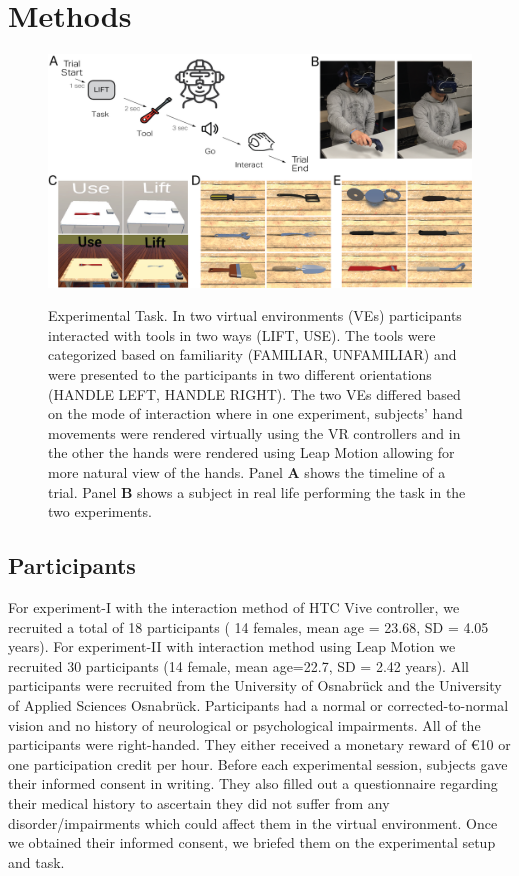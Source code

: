 \section{Methods}

\begin{figure}[H]
    \centering
    \includegraphics[width=1\linewidth]{source/figures/setup/Methods_1.png} \\
    \caption[]{Experimental Task. In two virtual environments (VEs) participants interacted with tools in two ways (LIFT, USE). The tools were categorized based on familiarity (FAMILIAR, UNFAMILIAR) and were presented to the participants in two different orientations (HANDLE LEFT, HANDLE RIGHT). The two VEs differed based on the mode of interaction where in one experiment, subjects' hand movements were rendered virtually using the VR controllers and in the other the hands were rendered using Leap Motion allowing for more natural view of the hands. Panel \textbf{A} shows the timeline of a trial. Panel \textbf{B} shows a subject in real life performing the task in the two experiments.}
    \label{figure:task}
\end{figure}

\subsection{Participants}

For experiment-I with the interaction method of HTC Vive controller, we recruited a total of 18 participants ( 14 females, mean age = 23.68, SD = 4.05 years). For experiment-II with interaction method using Leap Motion we recruited 30 participants (14 female, mean age=22.7, SD = 2.42 years). All participants were recruited from the University of Osnabrück and the University of Applied Sciences Osnabr{\"u}ck. Participants had a normal or corrected-to-normal vision and no history of neurological or psychological impairments. All of the participants were right-handed. They either received a monetary reward of €10 or one participation credit per hour. Before each experimental session, subjects gave their informed consent in writing. They also filled out a questionnaire regarding their medical history to ascertain they did not suffer from any disorder/impairments which could affect them in the virtual environment. Once we obtained their informed consent, we briefed them on the experimental setup and task. 

